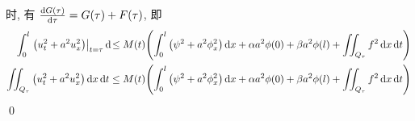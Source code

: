 \begin{solution}
时, 有 ${\frac{\operatorname{d\!} {G(\tau)}}{\operatorname{d\!} {\tau}}} = G(\tau) + F(\tau)$, 即
\[ \begin{aligned}
\int_0^l \mfwhen{\mclosure{u_t^2 + a^2 u_x^2}}{t=\tau} \diff \leq M(t)
\mclosure{
    \int_0^l \mclosure{\psi^2 + a^2 \phi_x^2} \diff x + \alpha a^2 \phi(0)
    + \beta a^2 \phi(l) + \iint_{Q_\tau} f^2 \diff x \diff t
} \\
\iint_{Q_\tau} \mclosure{u_t^2 + a^2 u_x^2} \diff x \diff t \leq M(t)
\mclosure{
    \int_0^l \mclosure{\psi^2 + a^2 \phi_x^2} \diff x + \alpha a^2 \phi(0)
    + \beta a^2 \phi(l) + \iint_{Q_\tau} f^2 \diff x \diff t
} \\
\end{aligned} \]
\qed
\end{solution}


\endinput

